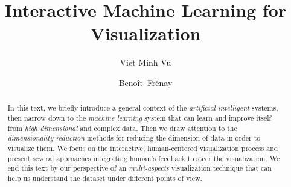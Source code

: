 \documentclass[sigconf,natbib=false]{acmart}
\begin{document}
\title{Interactive Machine Learning for Visualization}

\author{Viet Minh Vu}

\author{Beno\^it~Fr\'enay}

\renewcommand{\shortauthors}{V. M. Vu}

\begin{abstract}
In this text, we briefly introduce a general context of the \emph{artificial intelligent} systems, then narrow down to the \emph{machine learning} system that can learn and improve itself from \emph{high dimensional} and complex data. Then we draw attention to the \emph{dimensionality reduction} methods for reducing the dimension of data in order to visualize them. We focus on the interactive, human-centered visualization process and present several approaches integrating human's feedback to steer the visualization. We end this text by our perspective of an \emph{multi-aspects} visualization technique that can help us understand the dataset under different points of view.

\end{abstract}


\maketitle



\printbibliography
\end{document}
